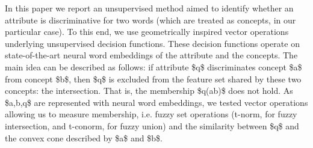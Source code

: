 In this paper we report an unsupervised method aimed to identify whether an attribute is discriminative for two words (which are treated as concepts, in our particular case). To this end, we use geometrically inspired vector operations underlying unsupervised decision functions. These decision functions operate on state-of-the-art neural word embeddings of the attribute and the concepts. The main idea can be described as follows: if attribute \$q\$ discriminates concept \$a\$ from concept \$b\$, then \$q\$ is excluded from the feature set shared by these two concepts: the intersection. That is, the membership \$q\in (a\cap b)\$ does not hold. As \$a,b,q\$ are represented with neural word embeddings, we tested vector operations allowing us to measure membership, i.e. fuzzy set operations (t-norm, for fuzzy intersection, and t-conorm, for fuzzy union) and the similarity between \$q\$ and the convex cone described by \$a\$ and \$b\$.

